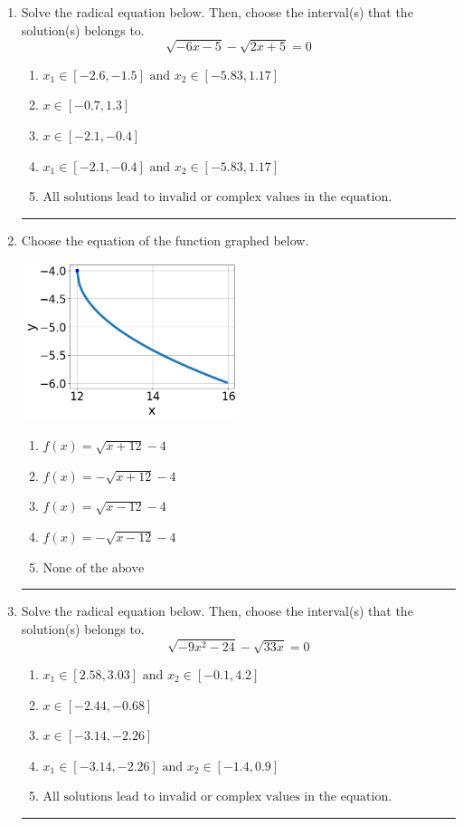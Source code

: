 \documentclass[14pt]{extbook}
\newcommand{\litem}[1]{\item#1\hspace*{-1cm}\rule{\textwidth}{0.4pt}}
\begin{document}
\begin{enumerate}
{\begin{enumerate}[label=\Alph*.]
\end{enumerate} }
\litem{
Solve the radical equation below. Then, choose the interval(s) that the solution(s) belongs to.\[ \sqrt{-6 x - 5} - \sqrt{2 x + 5} = 0 \]\begin{enumerate}[label=\Alph*.]
\item \( x_1 \in [-2.6, -1.5] \text{ and } x_2 \in [-5.83,1.17] \)
\item \( x \in [-0.7,1.3] \)
\item \( x \in [-2.1,-0.4] \)
\item \( x_1 \in [-2.1, -0.4] \text{ and } x_2 \in [-5.83,1.17] \)
\item \( \text{All solutions lead to invalid or complex values in the equation.} \)

\end{enumerate} }
\litem{
Choose the equation of the function graphed below.
\begin{center}
    \includegraphics[width=0.5\textwidth]{../Figures/radicalGraphToEquationC.png}
\end{center}
\begin{enumerate}[label=\Alph*.]
\item \( f(x) = \sqrt{x + 12} - 4 \)
\item \( f(x) = - \sqrt{x + 12} - 4 \)
\item \( f(x) = \sqrt{x - 12} - 4 \)
\item \( f(x) = - \sqrt{x - 12} - 4 \)
\item \( \text{None of the above} \)

\end{enumerate} }
\litem{
Solve the radical equation below. Then, choose the interval(s) that the solution(s) belongs to.\[ \sqrt{-9 x^2 - 24} - \sqrt{33 x} = 0 \]\begin{enumerate}[label=\Alph*.]
\item \( x_1 \in [2.58, 3.03] \text{ and } x_2 \in [-0.1,4.2] \)
\item \( x \in [-2.44,-0.68] \)
\item \( x \in [-3.14,-2.26] \)
\item \( x_1 \in [-3.14, -2.26] \text{ and } x_2 \in [-1.4,0.9] \)
\item \( \text{All solutions lead to invalid or complex values in the equation.} \)


\end{enumerate}}
\end{enumerate}
\end{document}
